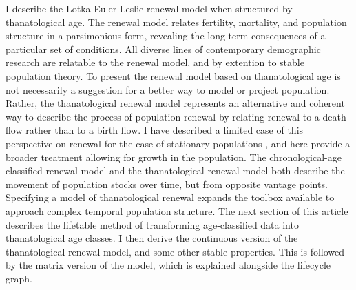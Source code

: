 \documentclass{article}
\begin{document}
I describe the Lotka-Euler-Leslie renewal model when structured by
thanatological age. The renewal model relates
fertility, mortality, and population structure in a parsimonious form, revealing the long term consequences of a particular set of conditions. All diverse lines of contemporary demographic research are relatable to the renewal model, and by extention to stable population theory.
To present the renewal model based on thanatological age is not necessarily a
suggestion for a better way to model or project population. Rather, the
thanatological renewal model represents an alternative and coherent way to
describe the process of population renewal by relating renewal to a death flow
rather than to a birth flow. I have described a limited case of this
perspective on renewal for the case of stationary populations
\citep{riffe2015force}, and here provide a broader treatment allowing for
growth in the population.
The chronological-age classified renewal model and the thanatological renewal model both describe the movement of population stocks over time, but from opposite vantage points. Specifying a model of thanatological renewal expands the toolbox available to approach complex
temporal population structure. The next section of this article describes the lifetable method of transforming age-classified
data into thanatological age classes. I then derive the continuous version of
the thanatological renewal model, and some other stable properties. This is
followed by the matrix version of the model, which is explained alongside the
lifecycle graph. 
\end{document}
